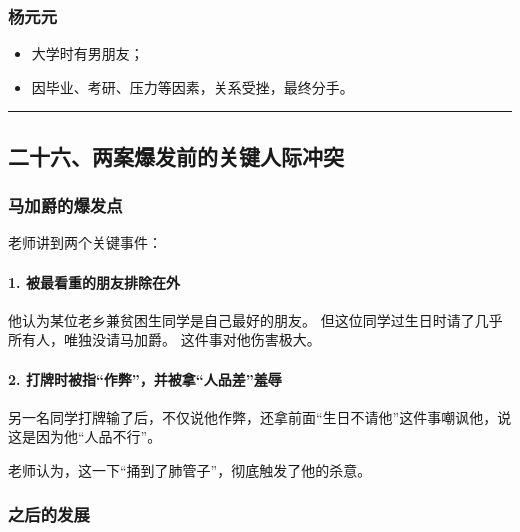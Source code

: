 \documentclass[
  chinese,
  9pt,
  a4paper,
]{ctexart}
\providecommand{\tightlist}{%
  \setlength{\itemsep}{0pt}\setlength{\parskip}{0pt}}
\begin{document}
\subsubsection{杨元元}\label{ux6768ux5143ux5143}

\begin{itemize}
\tightlist
\item
  大学时有男朋友；
\item
  因毕业、考研、压力等因素，关系受挫，最终分手。
\end{itemize}

\begin{center}\rule{0.5\linewidth}{0.5pt}\end{center}

\subsection{二十六、两案爆发前的关键人际冲突}\label{ux4e8cux5341ux516dux4e24ux6848ux7206ux53d1ux524dux7684ux5173ux952eux4ebaux9645ux51b2ux7a81}

\subsubsection{马加爵的爆发点}\label{ux9a6cux52a0ux7235ux7684ux7206ux53d1ux70b9}

老师讲到两个关键事件：

\paragraph{1.
被最看重的朋友排除在外}\label{ux88abux6700ux770bux91cdux7684ux670bux53cbux6392ux9664ux5728ux5916}

他认为某位老乡兼贫困生同学是自己最好的朋友。
但这位同学过生日时请了几乎所有人，唯独没请马加爵。 这件事对他伤害极大。

\paragraph{2.
打牌时被指``作弊''，并被拿``人品差''羞辱}\label{ux6253ux724cux65f6ux88abux6307ux4f5cux5f0aux5e76ux88abux62ffux4ebaux54c1ux5deeux7f9eux8fb1}

另一名同学打牌输了后，不仅说他作弊，还拿前面``生日不请他''这件事嘲讽他，说这是因为他``人品不行''。

老师认为，这一下``捅到了肺管子''，彻底触发了他的杀意。

\subsubsection{之后的发展}\label{ux4e4bux540eux7684ux53d1ux5c55}
\end{document}
